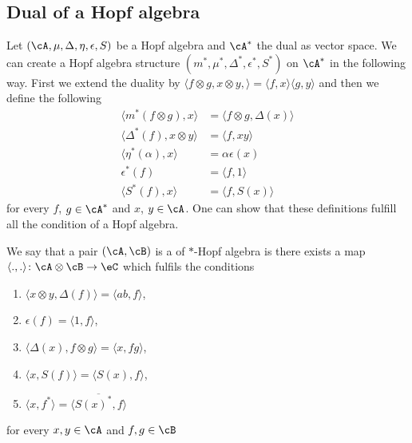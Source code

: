 \subsection{Dual of a Hopf algebra}

Let $(\cA,\mu,\Delta,\eta,\epsilon,S)$ be a Hopf algebra and $\cA^*$ the dual as vector space. We can create a Hopf algebra structure $(m^*,\mu^*,\Delta^*,\epsilon^*,S^*)$ on $\cA^*$ in the following way. First we extend the duality by $\langle f\otimes g,x\otimes y, \rangle =\langle f, x\rangle \langle g, y\rangle $ and then we define the following
\begin{subequations}
	\begin{align}
        \langle m^*(f\otimes g), x\rangle &=\langle f\otimes g, \Delta(x)\rangle    \label{subeqDualHopfmult} \\
		\langle \Delta^*(f), x\otimes y\rangle &=\langle f, xy\rangle \\
		\langle \eta^*(\alpha), x\rangle &=\alpha\epsilon(x)\\
		\epsilon^*(f)&=\langle f, 1\rangle \\
		\langle S^*(f), x\rangle &=\langle f, S(x)\rangle 
	\end{align}
\end{subequations}
for every $f$, $g\in\cA^*$ and $x$, $y\in\cA$. One can show that these definitions fulfill all the condition of a Hopf algebra.

We say that a pair $(\cA,\cB)$ is a  of $*$-Hopf algebra is there exists a map $\langle ., .\rangle \colon \cA\otimes\cB\to \eC$ which fulfils the conditions
\begin{enumerate}

	\item
		$\langle x\otimes y, \Delta(f)\rangle =\langle ab, f\rangle $,
	\item
		$\epsilon(f)=\langle 1, f\rangle $,
	\item
		$\langle \Delta(x), f\otimes g\rangle =\langle x, fg\rangle $,
	\item
		$\langle x, S(f)\rangle =\langle S(x), f\rangle $,
	\item
		$\langle x, f^*\rangle =\overline{ \langle S(x)^*, f\rangle  }$

\end{enumerate}
for every $x,y\in\cA$ and $f,g\in\cB$

